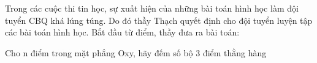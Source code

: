 Trong các cuộc thi tin học, sự xuất hiện của những bài toán hình học làm đội tuyển CBQ khá lúng túng. Do đó thầy Thạch quyết định cho đội tuyển luyện tập các bài toán hình học. Bắt đầu từ điểm, thầy đưa ra bài toán:  

   Cho n điểm trong mặt phẳng Oxy, hãy đếm số bộ 3 điểm thằng hàng